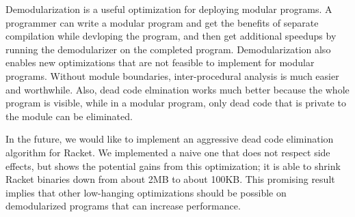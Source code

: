 \documentclass[ms,electronic,letterpaper,lol,lof,lot]{byumsphd}
\begin{document}
Demodularization is a useful optimization for deploying modular programs. 
A programmer can write a modular program and get the benefits of separate compilation while devloping the program, and then get additional speedups by running the demodularizer on the completed program.
Demodularization also enables new optimizations that are not feasible to implement for modular programs.
Without module boundaries, inter-procedural analysis is much easier and worthwhile.
Also, dead code elmination works much better because the whole program is visible, while in a modular program, only dead code that is private to the module can be eliminated.

In the future, we would like to implement an aggressive dead code elimination algorithm for Racket.
We implemented a naive one that does not respect side effects, but shows the potential gains from this optimization; it is able to shrink Racket binaries down from about 2MB to about 100KB.
This promising result implies that other low-hanging optimizations should be possible on demodularized programs that can increase performance.



\end{document}
